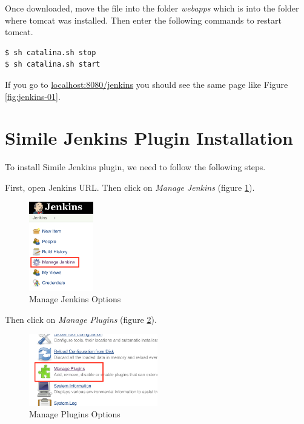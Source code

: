 Once downloaded, move the file into the folder \emph{webapps} which is into the folder where tomcat was installed. Then enter the following commands to restart tomcat.

\begin{verbatim}
$ sh catalina.sh stop
$ sh catalina.sh start
\end{verbatim}

If you go to \url{localhost:8080/jenkins} you should see the same page like Figure \ref{fig:jenkins-01}.

\section{Simile Jenkins Plugin Installation}
To install Simile Jenkins plugin, we need to follow the following steps.

First, open Jenkins URL. Then click on \textit{Manage Jenkins} (figure \ref{fig:jenkins-plugin-01}).

\begin{figure}[H]
	\centering
    \includegraphics[width=0.25\textwidth]{grafiken/jenkins-plugin-01}
    \caption{Manage Jenkins Options}
    \label{fig:jenkins-plugin-01}
\end{figure}

Then click on \textit{Manage Plugins} (figure \ref{fig:jenkins-plugin-02}).

\begin{figure}[H]
	\centering
    \includegraphics[width=0.5\textwidth]{grafiken/jenkins-plugin-02}
    \caption{Manage Plugins Options}
    \label{fig:jenkins-plugin-02}
\end{figure}

